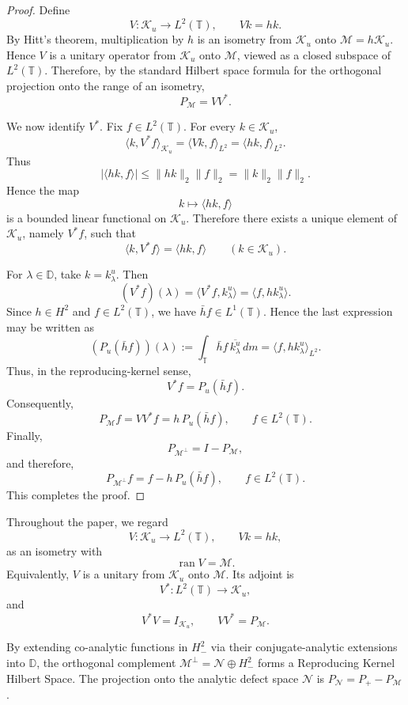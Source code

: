 \documentclass[12pt]{amsart}
\theoremstyle{definition}
\theoremstyle{remark}
\def \D{\mathbb{D}}
\def \T{\mathbb{T}}
\newcommand{\clm}{\mathcal{M}}
\newcommand{\cln}{\mathcal{N}}
\newcommand{\clk}{\mathcal{K}}
\numberwithin{equation}{section}
\begin{document}
\begin{proof}
Define
\[
V:\clk_u\to L^2(\T),\qquad Vk=hk .
\]
By Hitt's theorem, multiplication by $h$ is an isometry from $\clk_u$ onto $\clm=h\clk_u$. Hence $V$ is a unitary operator from $\clk_u$ onto $\clm$, viewed as a closed subspace of $L^2(\T)$. Therefore, by the standard Hilbert space formula for the orthogonal projection onto the range of an isometry,
\[
P_\clm=VV^*.
\]

We now identify $V^*$. Fix $f\in L^2(\T)$. For every $k\in\clk_u$,
\[
\langle k,V^*f\rangle_{\clk_u}
=
\langle Vk,f\rangle_{L^2}
=
\langle hk,f\rangle_{L^2}.
\]
Thus
\[
\left|\langle hk,f\rangle\right| \leq \|hk\|_2\|f\|_2 = \|k\|_2\|f\|_2.
\]
Hence the map
\[
k\mapsto \langle hk,f\rangle
\]
is a bounded linear functional on $\clk_u$. Therefore there exists a unique element of $\clk_u$, namely $V^*f$, such that
\[
\langle k,V^*f\rangle
=
\langle hk,f\rangle
\qquad (k\in\clk_u).
\]

For $\lambda\in\D$, take $k=k_\lambda^u$. Then
\[
(V^*f)(\lambda)
= \langle V^*f,k_\lambda^u\rangle = \langle f,hk_\lambda^u\rangle.
\]
Since $h\in H^2$ and $f\in L^2(\T)$, we have $\bar h f\in L^1(\T)$. Hence the last expression may be written as
\[
\left(P_u(\bar h f)\right)(\lambda)
:= \int_\T \bar h f\,\overline{k_\lambda^u}\,dm = \langle f,hk_\lambda^u\rangle_{L^2}.
\]
Thus, in the reproducing-kernel sense,
\[
V^*f=P_u(\bar h f).
\]
Consequently,
\[
P_\clm f = VV^*f = h\,P_u(\bar h f),
\qquad f\in L^2(\T).
\]
Finally,
\[
P_{\clm^\perp}=I-P_\clm,
\]
and therefore,
\[
P_{\clm^\perp}f
=
f-h\,P_u(\bar h f),
\qquad f\in L^2(\T).
\]
This completes the proof.
\end{proof}

Throughout the paper, we regard
\[
V:\clk_u\to L^2(\T),\qquad Vk=hk,
\]
as an isometry with
\[
\operatorname{ran}V=\clm.
\]
Equivalently, $V$ is a unitary from $\clk_u$ onto $\clm$. Its adjoint is
\[
V^*:L^2(\T)\to\clk_u,
\]
and
\[
V^*V=I_{\clk_u}, \qquad VV^*=P_\clm.
\]



By extending co-analytic functions in $H_{-}^2$ via their conjugate-analytic extensions into $\D$, the orthogonal complement $\clm^\perp = \cln \oplus H_{-}^2$ forms a Reproducing Kernel Hilbert Space. The projection onto the analytic defect space $\cln$ is $P_\cln = P_{+} - P_\clm$.
\end{document}

